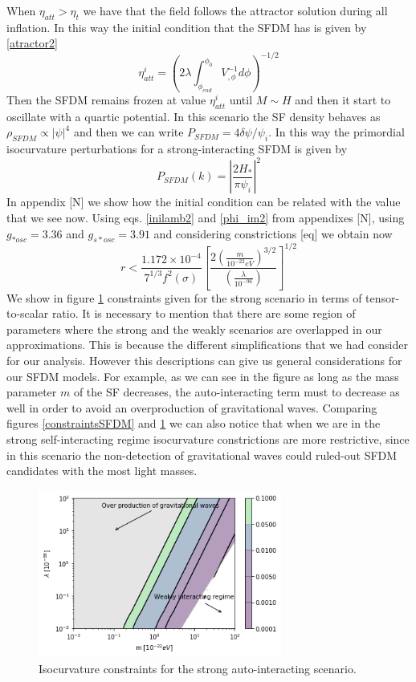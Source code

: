 \documentclass[twocolumn,           %
               showpacs,            %
               preprintnumbers,     %
               aps,                 %
               prl,          	    %
               letterpaper,             %
               superscriptaddress,      %
               nofootinbib,         %
               tightenlines,        %
               floats,floatfix      %
               ,usenatbib,
               ]{revtex4-1}
\begin{document}
When $\eta_{att}>\eta_t$ we have that the field follows the attractor solution during all inflation. In this way the initial condition that the SFDM has is given by \eqref{atractor2}
\begin{equation}\label{atractor3}
\eta_{att}^i = \left(2\lambda\int_{\phi_{end}}^{\phi_0}V^{-1}_{,\phi}d\phi\right)^{-1/2}
\end{equation}
Then the SFDM remains frozen at value $\eta_{att}^i$ until $M\sim H$ and then it start to oscillate with a quartic potential. In this scenario the SF density behaves as $\rho_{SFDM}\propto |\psi|^4$ and then we can write $P_{SFDM}=4\delta\psi/\psi_i$. In this way the primordial isocurvature perturbations for a strong-interacting SFDM is given by
\begin{equation}
P_{SFDM}(k)=\left|\frac{2H_*}{\pi\psi_i}\right|^2
\end{equation}
In appendix [N] we show how the initial condition can be related with the value that we see now. Using eqs. \eqref{inilamb2} and \eqref{phi_im2} from appendixes [N], using $g_{*osc}=3.36$ and $g_{s*osc}=3.91$  and considering constrictions [eq] we obtain now
\begin{equation}
r<\frac{1.172\times 10^{-4}}{7^{1/3}f^2(\sigma)}\left[\frac{2\left(\frac{m}{10^{-22}eV}\right)^{3/2}}{\left(\frac{\lambda}{10^{-96}}\right)}\right]^{1/2}
\end{equation}
We show in figure \ref{constraintsSFDMls} constraints given for the strong scenario in terms of tensor-to-scalar ratio. It is necessary to mention that there are some region of parameters where the strong and the weakly scenarios are overlapped in our approximations. This is because the different simplifications that we had consider for our analysis. However this descriptions can give us general considerations for our SFDM models. For example, as we can see in the figure as long as the mass parameter $m$ of the SF decreases, the auto-interacting term must to decrease as well in order to avoid an overproduction of gravitational waves. Comparing figures \ref{constraintsSFDM} and \ref{constraintsSFDMls} we can also notice that when we are in the strong self-interacting regime isocurvature constrictions are more restrictive, since in this scenario the non-detection of gravitational waves could ruled-out SFDM candidates with the most light masses.
\begin{figure}
\includegraphics[width=8cm]{stronglamb.png}
\caption{Isocurvature constraints for the strong auto-interacting scenario.}\label{constraintsSFDMls}
\end{figure} 
\end{document}
